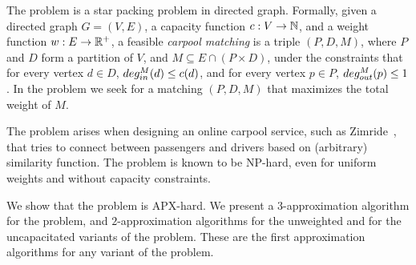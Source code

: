 The \textsc{\CARPOOL{}} problem is a star packing problem in directed graph.
Formally, given a directed graph $G = (V, E)$,
a capacity function $ c: V \rightarrow \mathbb{N} $,
and a weight function $w : E \rightarrow \mathbb{R^+} $,
a feasible \emph{carpool matching} is a triple 
$(P, D, M)$, where $P$ and $D$ form a partition of $V$, and 
$M \subseteq E \cap (P \times D)$,
under the constraints that for every vertex $d \in D$, 
$deg^M_{in}(d) \leq c(d)$, 
and for every vertex $p \in P$, $deg^M_{out}(p) \leq 1$.
In the \textsc{\CARPOOL{}} problem we seek for a matching $(P, D, M)$ that maximizes the
total weight of $M$.

The problem arises when designing an online carpool service, 
such as Zimride~\cite{zimride}, 
that tries to connect between passengers and drivers based on (arbitrary) similarity function.
The problem is known to be NP-hard, 
even for uniform weights and without capacity constraints.

We show that the \textsc{\CARPOOL{}} problem is APX-hard. 
We present a $3$-approximation algorithm for the problem,
and $2$-approximation algorithms for the 
unweighted and for the uncapacitated variants of the problem.
These are the first approximation algorithms for any variant of the problem.
